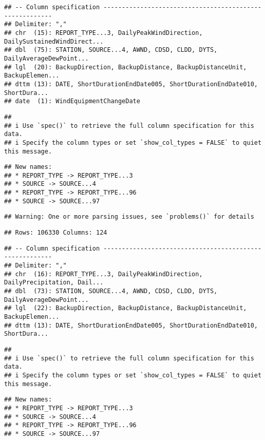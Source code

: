 \documentclass[
]{article}
\begin{document}
\begin{verbatim}
## -- Column specification --------------------------------------------------------
## Delimiter: ","
## chr  (15): REPORT_TYPE...3, DailyPeakWindDirection, DailySustainedWindDirect...
## dbl  (75): STATION, SOURCE...4, AWND, CDSD, CLDD, DYTS, DailyAverageDewPoint...
## lgl  (20): BackupDirection, BackupDistance, BackupDistanceUnit, BackupElemen...
## dttm (13): DATE, ShortDurationEndDate005, ShortDurationEndDate010, ShortDura...
## date  (1): WindEquipmentChangeDate
\end{verbatim}

\begin{verbatim}
## 
## i Use `spec()` to retrieve the full column specification for this data.
## i Specify the column types or set `show_col_types = FALSE` to quiet this message.
\end{verbatim}

\begin{verbatim}
## New names:
## * REPORT_TYPE -> REPORT_TYPE...3
## * SOURCE -> SOURCE...4
## * REPORT_TYPE -> REPORT_TYPE...96
## * SOURCE -> SOURCE...97
\end{verbatim}

\begin{verbatim}
## Warning: One or more parsing issues, see `problems()` for details
\end{verbatim}

\begin{verbatim}
## Rows: 106330 Columns: 124
\end{verbatim}

\begin{verbatim}
## -- Column specification --------------------------------------------------------
## Delimiter: ","
## chr  (16): REPORT_TYPE...3, DailyPeakWindDirection, DailyPrecipitation, Dail...
## dbl  (73): STATION, SOURCE...4, AWND, CDSD, CLDD, DYTS, DailyAverageDewPoint...
## lgl  (22): BackupDirection, BackupDistance, BackupDistanceUnit, BackupElemen...
## dttm (13): DATE, ShortDurationEndDate005, ShortDurationEndDate010, ShortDura...
\end{verbatim}

\begin{verbatim}
## 
## i Use `spec()` to retrieve the full column specification for this data.
## i Specify the column types or set `show_col_types = FALSE` to quiet this message.
\end{verbatim}

\begin{verbatim}
## New names:
## * REPORT_TYPE -> REPORT_TYPE...3
## * SOURCE -> SOURCE...4
## * REPORT_TYPE -> REPORT_TYPE...96
## * SOURCE -> SOURCE...97
\end{verbatim}
\end{document}
